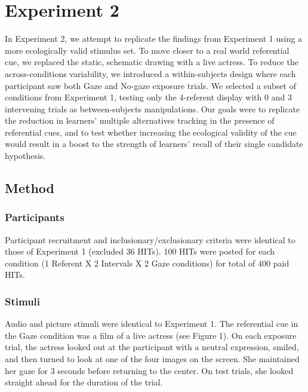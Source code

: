 \documentclass[a4paper,man,natbib]{apa6}
\begin{document}
\section{Experiment 2}\label{experiment-2}

In Experiment 2, we attempt to replicate the findings from Experiment 1
using a more ecologically valid stimulus set. To move closer to a real
world referential cue, we replaced the static, schematic drawing with a
live actress. To reduce the across-conditions variability, we introduced
a within-subjects design where each participant saw both Gaze and
No-gaze exposure trials. We selected a subset of conditions from
Experiment 1, testing only the 4-referent display with 0 and 3
intervening trials as between-subjects manipulations. Our goals were to
replicate the reduction in learners' multiple alternatives tracking in
the presence of referential cues, and to test whether increasing the
ecological validity of the cue would result in a boost to the strength
of learners' recall of their single candidate hypothesis.

\subsection{Method}\label{method-1}

\subsubsection{Participants}\label{participants-1}

Participant recruitment and inclusionary/exclusionary criteria were
identical to those of Experiment 1 (excluded 36 HITs). 100 HITs were
posted for each condition (1 Referent X 2 Intervals X 2 Gaze conditions)
for total of 400 paid HITs.

\subsubsection{Stimuli}\label{stimuli-1}

Audio and picture stimuli were identical to Experiment 1. The
referential cue in the Gaze condition was a film of a live actress (see
Figure 1). On each exposure trial, the actress looked out at the
participant with a neutral expression, smiled, and then turned to look
at one of the four images on the screen. She maintained her gaze for 3
seconds before returning to the center. On test trials, she looked
straight ahead for the duration of the trial.
\end{document}
